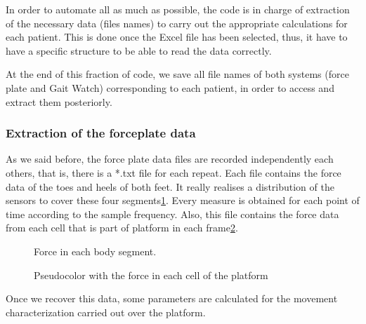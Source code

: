 In order to automate all as much as possible, the code is in charge of extraction of the necessary data (files names) to carry out the appropriate calculations for each patient. This is done once the Excel file has been selected, thus, it have to have a specific structure to be able to read the data correctly.

At the end of this fraction of code, we save all file names of both systems (force plate and Gait Watch) corresponding to each patient, in order to access and extract them posteriorly.

\subsubsection{Extraction of the forceplate data}
As we said before, the  force plate data files are recorded independently each others, that is, there is a *.txt file for each repeat.
Each file contains the force data of the toes and heels of both feet. It really realises a distribution of the sensors to cover these four segments\ref{fig:Force4signals}. Every measure is obtained for each point of time according to the sample frequency. Also, this file contains the force data from each cell that is part of platform in each frame\ref{fig:pseudocolor}.

\begin{figure}[H]
	\centering
	\caption{Force in each body segment.}
	\label{fig:Force4signals}
\end{figure}

\begin{figure}[H]
	\centering
	\caption{Pseudocolor with the force in each cell of the platform}
	\label{fig:pseudocolor}
\end{figure}

Once we recover this data, some parameters are calculated for the movement characterization carried out over the platform. 

